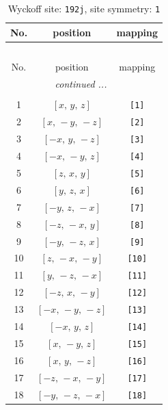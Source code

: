 \documentclass[fleqn,8pt]{jsarticle}
\begin{document}
\begin{longtable}{ccc}
\caption{Wyckoff site: {\tt 192j}, site symmetry: {\tt 1}}
 \\
 \hline \hline
No. & position & mapping \\ \hline \endfirsthead

\multicolumn{2}{l}{\tablename\ \thetable{}} \\
 \hline \hline
No. & position & mapping \\ \hline \endhead

 \hline \hline
\multicolumn{2}{r}{\footnotesize\it continued ...} \\ \endfoot

 \hline \hline
\multicolumn{2}{r}{} \\ \endlastfoot

1 & $\left[ x,\, y,\, z \right]$ & {\tt [1]} \\ \hline
2 & $\left[ x,\, - y,\, - z \right]$ & {\tt [2]} \\ \hline
3 & $\left[ - x,\, y,\, - z \right]$ & {\tt [3]} \\ \hline
4 & $\left[ - x,\, - y,\, z \right]$ & {\tt [4]} \\ \hline
5 & $\left[ z,\, x,\, y \right]$ & {\tt [5]} \\ \hline
6 & $\left[ y,\, z,\, x \right]$ & {\tt [6]} \\ \hline
7 & $\left[ - y,\, z,\, - x \right]$ & {\tt [7]} \\ \hline
8 & $\left[ - z,\, - x,\, y \right]$ & {\tt [8]} \\ \hline
9 & $\left[ - y,\, - z,\, x \right]$ & {\tt [9]} \\ \hline
10 & $\left[ z,\, - x,\, - y \right]$ & {\tt [10]} \\ \hline
11 & $\left[ y,\, - z,\, - x \right]$ & {\tt [11]} \\ \hline
12 & $\left[ - z,\, x,\, - y \right]$ & {\tt [12]} \\ \hline
13 & $\left[ - x,\, - y,\, - z \right]$ & {\tt [13]} \\ \hline
14 & $\left[ - x,\, y,\, z \right]$ & {\tt [14]} \\ \hline
15 & $\left[ x,\, - y,\, z \right]$ & {\tt [15]} \\ \hline
16 & $\left[ x,\, y,\, - z \right]$ & {\tt [16]} \\ \hline
17 & $\left[ - z,\, - x,\, - y \right]$ & {\tt [17]} \\ \hline
18 & $\left[ - y,\, - z,\, - x \right]$ & {\tt [18]} \\ \hline

\end{longtable}
\end{document}
